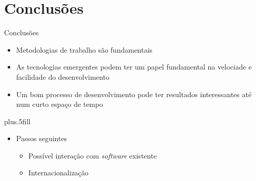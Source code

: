 \documentclass[portuges]{beamer}
\begin{document}
\section*{Conclusões}

\begin{frame}{Conclusões}

  \begin{itemize}
  \item Metodologias de trabalho são fundamentais
  \item As tecnologias emergentes podem ter um papel fundamental na velociade e facilidade do desenvolvimento
  \item Um bom processo de desenvolvimento pode ter resultados interessantes até num curto espaço de tempo 
  \end{itemize}
  
  \vskip0pt plus.5fill
  \begin{itemize}
  \item
    Passos seguintes
    \begin{itemize}
    \item Possível interação com \emph{software} existente 
    \item Internacionalização
    \end{itemize}
  \end{itemize}
\end{frame}
\end{document}
